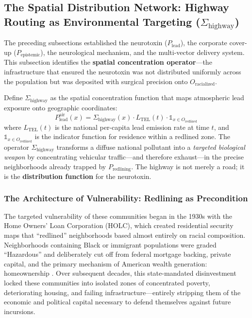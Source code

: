 \documentclass[12pt,openany]{book}
\begin{document}
\FloatBarrier

\subsection{The Spatial Distribution Network: Highway Routing as Environmental Targeting (\texorpdfstring{$\Sigma_{\text{highway}}$}{Sigma\_highway})}

The preceding subsections established the neurotoxin ($P_{\text{lead}}$), the corporate cover-up ($P_{\text{epistemic}}$), the neurological mechanism, and the multi-vector delivery system. This subsection identifies the \textbf{spatial concentration operator}---the infrastructure that ensured the neurotoxin was not distributed uniformly across the population but was deposited with surgical precision onto $O_{\text{racialized}}$.

Define $\Sigma_{\text{highway}}$ as the spatial concentration function that maps atmospheric lead exposure onto geographic coordinates:
\[
P_{\text{lead}}^{\text{air}}(x) = \Sigma_{\text{highway}}(x) \cdot L_{\text{TEL}}(t) \cdot \mathbb{1}_{x \in O_{\text{redlined}}}
\]
where $L_{\text{TEL}}(t)$ is the national per-capita lead emission rate at time $t$, and $\mathbb{1}_{x \in O_{\text{redlined}}}$ is the indicator function for residence within a redlined zone. The operator $\Sigma_{\text{highway}}$ transforms a diffuse national pollutant into a \textit{targeted biological weapon} by concentrating vehicular traffic---and therefore exhaust---in the precise neighborhoods already trapped by $P_{\text{redlining}}$. The highway is not merely a road; it is the \textbf{distribution function} for the neurotoxin.

\subsubsection{The Architecture of Vulnerability: Redlining as Precondition}

The targeted vulnerability of these communities began in the 1930s with the Home Owners' Loan Corporation (HOLC), which created residential security maps that ``redlined'' neighborhoods based almost entirely on racial composition. Neighborhoods containing Black or immigrant populations were graded ``Hazardous'' and deliberately cut off from federal mortgage backing, private capital, and the primary mechanism of American wealth generation: homeownership \cite{rothstein}. Over subsequent decades, this state-mandated disinvestment locked these communities into isolated zones of concentrated poverty, deteriorating housing, and failing infrastructure---entirely stripping them of the economic and political capital necessary to defend themselves against future incursions.
\end{document}
